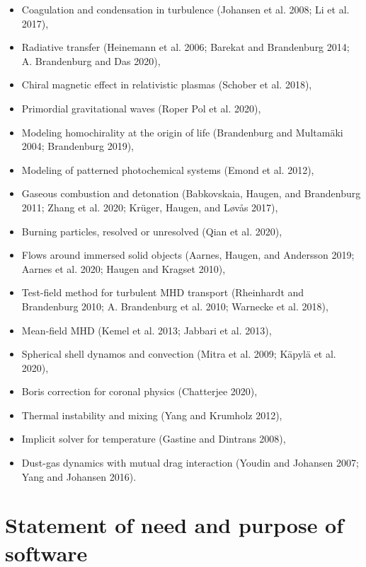 \documentclass[10pt,a4paper,onecolumn]{article}
\providecommand{\tightlist}{%
  \setlength{\itemsep}{0pt}\setlength{\parskip}{0pt}}
\begin{document}
\begin{itemize}
\tightlist
\item
  Coagulation and condensation in turbulence (Johansen et al. 2008; Li
  et al. 2017),
\item
  Radiative transfer (Heinemann et al. 2006; Barekat and Brandenburg
  2014; A. Brandenburg and Das 2020),
\item
  Chiral magnetic effect in relativistic plasmas (Schober et al. 2018),
\item
  Primordial gravitational waves (Roper Pol et al. 2020),
\item
  Modeling homochirality at the origin of life (Brandenburg and
  Multamäki 2004; Brandenburg 2019),
\item
  Modeling of patterned photochemical systems (Emond et al. 2012),
\item
  Gaseous combustion and detonation (Babkovskaia, Haugen, and
  Brandenburg 2011; Zhang et al. 2020; Krüger, Haugen, and Løvås 2017),
\item
  Burning particles, resolved or unresolved (Qian et al. 2020),
\item
  Flows around immersed solid objects (Aarnes, Haugen, and Andersson
  2019; Aarnes et al. 2020; Haugen and Kragset 2010),
\item
  Test-field method for turbulent MHD transport (Rheinhardt and
  Brandenburg 2010; A. Brandenburg et al. 2010; Warnecke et al. 2018),
\item
  Mean-field MHD (Kemel et al. 2013; Jabbari et al. 2013),
\item
  Spherical shell dynamos and convection (Mitra et al. 2009; Käpylä et
  al. 2020),
\item
  Boris correction for coronal physics (Chatterjee 2020),
\item
  Thermal instability and mixing (Yang and Krumholz 2012),
\item
  Implicit solver for temperature (Gastine and Dintrans 2008),
\item
  Dust-gas dynamics with mutual drag interaction (Youdin and Johansen
  2007; Yang and Johansen 2016).
\end{itemize}

\hypertarget{statement-of-need-and-purpose-of-software}{%
\section{Statement of need and purpose of
software}\label{statement-of-need-and-purpose-of-software}}
\end{document}
